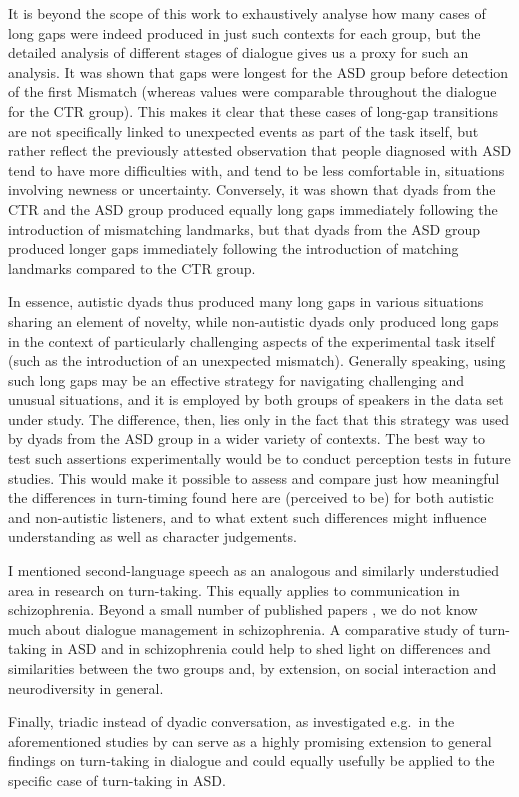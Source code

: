 It is beyond the scope of this work to exhaustively analyse how many cases of long gaps were indeed produced in just such contexts for each group, but the detailed analysis of different stages of dialogue gives us a proxy for such an analysis. It was shown that gaps were longest for the ASD group before detection of the first Mismatch (whereas values were comparable throughout the dialogue for the CTR group). This makes it clear that these cases of long-gap transitions are not specifically linked to unexpected events as part of the task itself, but rather reflect the previously attested observation that people diagnosed with ASD tend to have more difficulties with, and tend to be less comfortable in, situations involving newness or uncertainty. Conversely, it was shown that dyads from the CTR and the ASD group produced equally long gaps immediately following the introduction of mismatching landmarks, but that dyads from the ASD group produced longer gaps immediately following the introduction of matching landmarks compared to the CTR group.

In essence, autistic dyads thus produced many long gaps in various situations sharing an element of novelty, while non-autistic dyads only produced long gaps in the context of particularly challenging aspects of the experimental task itself (such as the introduction of an unexpected mismatch). Generally speaking, using such long gaps may be an effective strategy for navigating challenging and unusual situations, and it is employed by both groups of speakers in the data set under study. The difference, then, lies only in the fact that this strategy was used by dyads from the ASD group in a wider variety of contexts. The best way to test such assertions experimentally would be to conduct perception tests in future studies. This would make it possible to assess and compare just how meaningful the differences in turn-timing found here are (perceived to be) for both autistic and non-autistic listeners, and to what extent such differences might influence understanding as well as character judgements.

I mentioned second-language speech as an analogous and similarly understudied area in research on turn-taking. This equally applies to communication in schizophrenia. Beyond a small number of published papers \citep{breitholtzReasoningMultipartyDialogue2020, howesDisfluenciesDialoguesPatients2017, lucariniConversationalMetricsPsychopathological2021,cangemiContentfreeSpeechActivity2023}, we do not know much about dialogue management in schizophrenia. A comparative study of turn-taking in ASD and in schizophrenia could help to shed light on differences and similarities between the two groups and, by extension, on social interaction and neurodiversity in general.

Finally, triadic instead of dyadic conversation, as investigated e.g.~in the aforementioned studies by \citet{auerGazeAddresseeSelection2018,breitholtzReasoningMultipartyDialogue2020} can serve as a highly promising extension to general findings on turn-taking in dialogue and could equally usefully be applied to the specific case of turn-taking in ASD.



